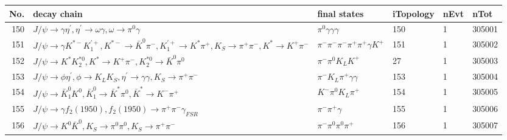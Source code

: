 \begin{table}[htbp] 
\begin{center}
\begin{small}
\begin{tabular}{rlllll}\hline\hline
 No. & decay chain & final states &  iTopology & nEvt & nTot \\\hline
150&$J/\psi       \rightarrow \gamma       \eta^{\prime} , \eta^{\prime}  \rightarrow \omega         \gamma       , \omega          \rightarrow \pi^{0}        \gamma       $&$\pi^{0}        \gamma       \gamma       \gamma       $&  150&    1&305001\\
151&$J/\psi       \rightarrow \gamma       K^{*-}         K_1^{'+}      , K^{*-}          \rightarrow \bar{K}^{0}   \pi^{-}        , K_1^{'+}       \rightarrow K^{*}          \pi^{+}        , K_{S}           \rightarrow \pi^{+}        \pi^{-}        , K^{*}           \rightarrow K^{+}          \pi^{-}        $&$\pi^{-}        \pi^{-}        \pi^{-}        \pi^{+}        \pi^{+}        \gamma       K^{+}          $&  151&    1&305002\\
152&$J/\psi       \rightarrow K^{*}          K_2^{*0}       , K^{*}           \rightarrow K^{+}          \pi^{-}        , K_2^{*0}        \rightarrow \bar{K}^{0}   \pi^{0}        $&$\pi^{-}        \pi^{0}        K_{L}          K^{+}          $&   27&    1&305003\\
153&$J/\psi       \rightarrow \phi           \eta^{\prime} , \phi            \rightarrow K_{L}          K_{S}          , \eta^{\prime}  \rightarrow \gamma       \gamma       , K_{S}           \rightarrow \pi^{+}        \pi^{-}        $&$\pi^{-}        K_{L}          \pi^{+}        \gamma       \gamma       $&  153&    1&305004\\
154&$J/\psi       \rightarrow \bar{K}_1^{0} K^{0}          , \bar{K}_1^{0}  \rightarrow \bar{K}^{*}   \pi^{0}        , \bar{K}^{*}    \rightarrow K^{-}          \pi^{+}        $&$K^{-}          \pi^{0}        K_{L}          \pi^{+}        $&  154&    1&305005\\
155&$J/\psi       \rightarrow \gamma       f_{2}(1950)    , f_{2}(1950)     \rightarrow \pi^{+}        \pi^{-}        \gamma_{FSR} $&$\pi^{-}        \pi^{+}        \gamma       $&  155&    1&305006\\
156&$J/\psi       \rightarrow K^{0}          \bar{K}^{0}   , K_{S}           \rightarrow \pi^{0}        \pi^{0}        , K_{S}           \rightarrow \pi^{+}        \pi^{-}        $&$\pi^{-}        \pi^{0}        \pi^{0}        \pi^{+}        $&  156&    1&305007\\

\end{tabular}
\end{small}
\end{center}
\end{table}
